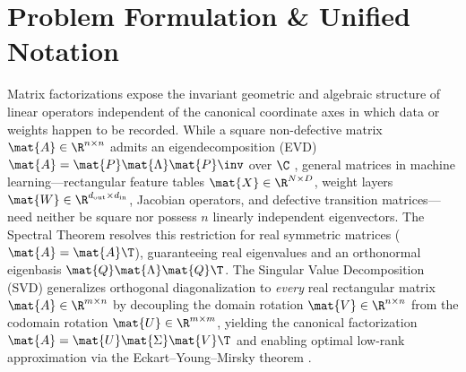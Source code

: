 \documentclass[../../../../master.tex]{subfiles}
\begin{document}

\section{Problem Formulation \& Unified Notation}
\label{sec:svd:formulation}

Matrix factorizations expose the invariant geometric and algebraic structure of linear operators independent of the canonical coordinate axes in which data or weights happen to be recorded. While a square non-defective matrix $\mat{A} \in \R^{n \times n}$ admits an eigendecomposition (EVD) $\mat{A} = \mat{P}\mat{\Lambda}\mat{P}\inv$ over $\C$ , general matrices in machine learning---rectangular feature tables $\mat{X} \in \R^{N \times D}$, weight layers $\mat{W} \in \R^{d_{\text{out}} \times d_{\text{in}}}$, Jacobian operators, and defective transition matrices---need neither be square nor possess $n$ linearly independent eigenvectors. The Spectral Theorem resolves this restriction for real symmetric matrices ($\mat{A} = \mat{A}\T$), guaranteeing real eigenvalues and an orthonormal eigenbasis $\mat{Q}\mat{\Lambda}\mat{Q}\T$. The Singular Value Decomposition (SVD) generalizes orthogonal diagonalization to \emph{every} real rectangular matrix $\mat{A} \in \R^{m \times n}$ by decoupling the domain rotation $\mat{V} \in \R^{n \times n}$ from the codomain rotation $\mat{U} \in \R^{m \times m}$, yielding the canonical factorization $\mat{A} = \mat{U}\mat{\Sigma}\mat{V}\T$ and enabling optimal low-rank approximation via the Eckart--Young--Mirsky theorem  .
\end{document}
